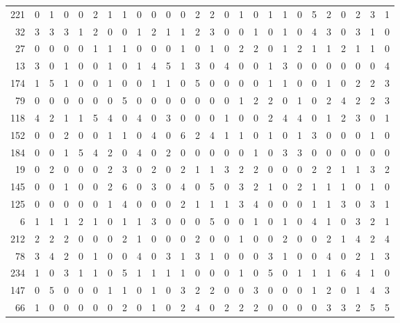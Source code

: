 \begin{longtable}{@{\extracolsep{\fill}}rccccccccccccccccccccccccc@{}}
221 & 0 & 1 & 0 & 0 & 2 & 1 & 1 & 0 & 0 & 0 & 0 & 2 & 2 & 0 & 1 & 0 & 1 & 1 & 0 & 5 & 2 & 0 & 2 & 3 & 1 \\
32 & 3 & 3 & 3 & 1 & 2 & 0 & 0 & 1 & 2 & 1 & 1 & 2 & 3 & 0 & 0 & 1 & 0 & 1 & 0 & 4 & 3 & 0 & 3 & 1 & 0 \\
27 & 0 & 0 & 0 & 0 & 1 & 1 & 1 & 0 & 0 & 0 & 1 & 0 & 1 & 0 & 2 & 2 & 0 & 1 & 2 & 1 & 1 & 2 & 1 & 1 & 0 \\
13 & 3 & 0 & 1 & 0 & 0 & 1 & 0 & 1 & 4 & 5 & 1 & 3 & 0 & 4 & 0 & 0 & 1 & 3 & 0 & 0 & 0 & 0 & 0 & 0 & 4 \\
174 & 1 & 5 & 1 & 0 & 0 & 1 & 0 & 0 & 1 & 1 & 0 & 5 & 0 & 0 & 0 & 0 & 1 & 1 & 0 & 0 & 1 & 0 & 2 & 2 & 3 \\
79 & 0 & 0 & 0 & 0 & 0 & 0 & 5 & 0 & 0 & 0 & 0 & 0 & 0 & 0 & 1 & 2 & 2 & 0 & 1 & 0 & 2 & 4 & 2 & 2 & 3 \\
118 & 4 & 2 & 1 & 1 & 5 & 4 & 0 & 4 & 0 & 3 & 0 & 0 & 0 & 1 & 0 & 0 & 2 & 4 & 4 & 0 & 1 & 2 & 3 & 0 & 1 \\
152 & 0 & 0 & 2 & 0 & 0 & 1 & 1 & 0 & 4 & 0 & 6 & 2 & 4 & 1 & 1 & 0 & 1 & 0 & 1 & 3 & 0 & 0 & 0 & 1 & 0 \\
184 & 0 & 0 & 1 & 5 & 4 & 2 & 0 & 4 & 0 & 2 & 0 & 0 & 0 & 0 & 0 & 1 & 0 & 3 & 3 & 0 & 0 & 0 & 0 & 0 & 0 \\
19 & 0 & 2 & 0 & 0 & 0 & 2 & 3 & 0 & 2 & 0 & 2 & 1 & 1 & 3 & 2 & 2 & 0 & 0 & 0 & 2 & 2 & 1 & 1 & 3 & 2 \\
145 & 0 & 0 & 1 & 0 & 0 & 2 & 6 & 0 & 3 & 0 & 4 & 0 & 5 & 0 & 3 & 2 & 1 & 0 & 2 & 1 & 1 & 1 & 0 & 1 & 0 \\
125 & 0 & 0 & 0 & 0 & 0 & 1 & 4 & 0 & 0 & 0 & 2 & 1 & 1 & 1 & 3 & 4 & 0 & 0 & 0 & 1 & 1 & 3 & 0 & 3 & 1 \\
6 & 1 & 1 & 1 & 2 & 1 & 0 & 1 & 1 & 3 & 0 & 0 & 0 & 5 & 0 & 0 & 1 & 0 & 1 & 0 & 4 & 1 & 0 & 3 & 2 & 1 \\
212 & 2 & 2 & 2 & 0 & 0 & 0 & 2 & 1 & 0 & 0 & 0 & 2 & 0 & 0 & 1 & 0 & 0 & 2 & 0 & 0 & 2 & 1 & 4 & 2 & 4 \\
78 & 3 & 4 & 2 & 0 & 1 & 0 & 0 & 4 & 0 & 3 & 1 & 3 & 1 & 0 & 0 & 0 & 3 & 1 & 0 & 0 & 4 & 0 & 2 & 1 & 3 \\
234 & 1 & 0 & 3 & 1 & 1 & 0 & 5 & 1 & 1 & 1 & 1 & 0 & 0 & 0 & 1 & 0 & 5 & 0 & 1 & 1 & 1 & 6 & 4 & 1 & 0 \\
147 & 0 & 5 & 0 & 0 & 0 & 1 & 1 & 0 & 1 & 0 & 3 & 2 & 2 & 0 & 0 & 3 & 0 & 0 & 0 & 1 & 2 & 0 & 1 & 4 & 3 \\
66 & 1 & 0 & 0 & 0 & 0 & 0 & 2 & 0 & 1 & 0 & 2 & 4 & 0 & 2 & 2 & 2 & 0 & 0 & 0 & 0 & 3 & 3 & 2 & 5 & 5 \\

\end{longtable}
